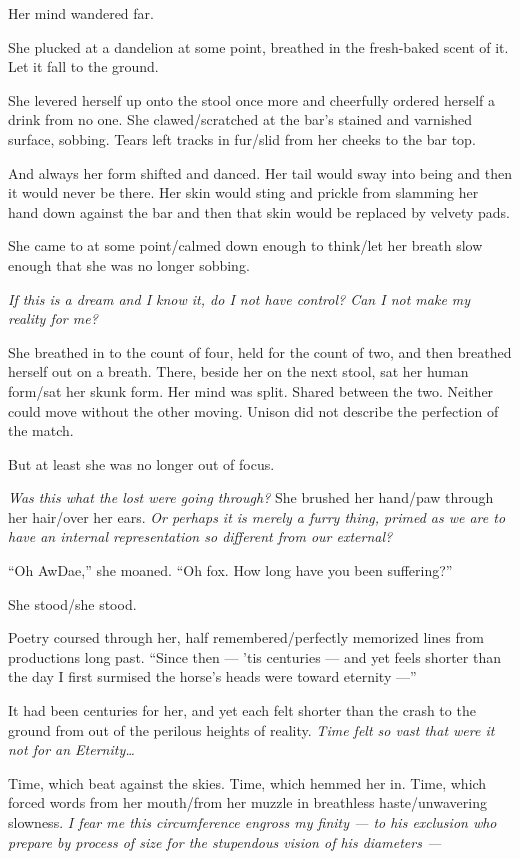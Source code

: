 Her mind wandered far.

She plucked at a dandelion at some point, breathed in the fresh-baked scent of it. Let it fall to the ground.

She levered herself up onto the stool once more and cheerfully ordered herself a drink from no one. She clawed/scratched at the bar's stained and varnished surface, sobbing. Tears left tracks in fur/slid from her cheeks to the bar top.

And always her form shifted and danced. Her tail would sway into being and then it would never be there. Her skin would sting and prickle from slamming her hand down against the bar and then that skin would be replaced by velvety pads.

She came to at some point/calmed down enough to think/let her breath slow enough that she was no longer sobbing.

\emph{If this is a dream and I know it, do I not have control? Can I not make my reality for me?}

She breathed in to the count of four, held for the count of two, and then breathed herself out on a breath. There, beside her on the next stool, sat her human form/sat her skunk form. Her mind was split. Shared between the two. Neither could move without the other moving. Unison did not describe the perfection of the match.

But at least she was no longer out of focus.

\emph{Was this what the lost were going through?} She brushed her hand/paw through her hair/over her ears. \emph{Or perhaps it is merely a furry thing, primed as we are to have an internal representation so different from our external?}

``Oh AwDae,'' she moaned. ``Oh fox. How long have you been suffering?''

She stood/she stood.

Poetry coursed through her, half remembered/perfectly memorized lines from productions long past. ``Since then — 'tis centuries — and yet feels shorter than the day I first surmised the horse's heads were toward eternity —''

It had been centuries for her, and yet each felt shorter than the crash to the ground from out of the perilous heights of reality. \emph{Time felt so vast that were it not for an Eternity\ldots{}}

Time, which beat against the skies. Time, which hemmed her in. Time, which forced words from her mouth/from her muzzle in breathless haste/unwavering slowness. \emph{I fear me this circumference engross my finity — to his exclusion who prepare by process of size for the stupendous vision of his diameters —}

